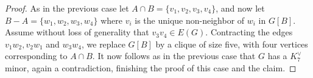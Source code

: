 \documentclass[10pt,a4paper]{amsart}
\begin{document}
\begin{proof}
 \vskip 5pt 
  As in the previous case let $A \cap B = \{v_1,v_2,v_3,v_4\}$, and now let $B-A = \{w_1,w_2,w_3,w_4\}$ where $v_i $ is the unique non-neighbor of $w_i$ in $G[B]$. Assume without loss of generality that $v_3v_4 \in E(G)$. Contracting the edges $v_1w_2,v_2w_1$ and $w_3w_4$, we replace $G[B]$ by a clique of size five, with four vertices corresponding to $A \cap B$. It now follows as in the previous case that $G$ has a $K_7^{\vee}$ minor, again a contradiction, finishing the proof of this case and the claim.
 \end{proof}
\end{document}
